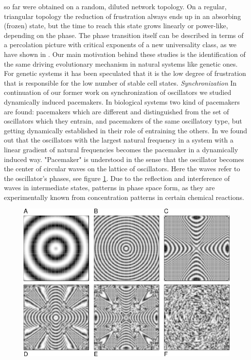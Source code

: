 so far were obtained on a random, diluted network topology. On a
regular, triangular topology the reduction of frustration
always ends up in an absorbing (frozen) state, but the time to
reach this state grows linearly or power-like, depending on the
phase. The phase transition itself can be described in terms of a
percolation picture with critical exponents of a new universality
class, as we have shown in \cite{ortmanns2}. Our main motivation
behind these studies is the identification of the same driving
evolutionary mechanism in natural systems like genetic ones. For
genetic systems it has been speculated that it is the low degree
of frustration that is responsible for the low number of stable
cell states. \vskip5pt {\it Synchronization} In continuation of our former work on
synchronization of oscillators \cite{ortmanns3} we studied
dynamically induced pacemakers. In biological systems two kind of
pacemakers are found: pacemakers which are different and
distinguished from the set of oscillators which they entrain, and
pacemakers of the same oscillatory type, but getting dynamically
established in their role of entraining the others. In
\cite{ortmanns4} we found out that the oscillators with the
largest natural frequency in a system with a linear gradient of
natural frequencies becomes the pacemaker in a dynamically induced
way. "Pacemaker" is understood in the sense that the oscillator
becomes the center of circular waves on the lattice of
oscillators. Here the waves refer to the oscillator's phases, see
figure \ref{fig:ortmanns}. Due to the reflection and interference
of waves in intermediate states, patterns in phase space form, as
they are experimentally known from concentration patterns in
certain chemical reactions.


\begin{figure}[ht]
  \begin{center}
    \includegraphics[width=\hsize]{Ortmanns/ortmanns2.png}
    \label{fig:ortmanns}
   \end{center}
\end{figure}

